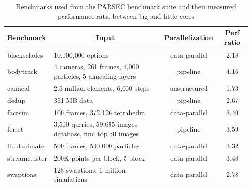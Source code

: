 \begin{table}[!t]
	\centering
	\scriptsize
	\caption{Benchmarks used from the PARSEC benchmark suite and their 
measured performance ratio between big and little cores}
	\setlength{\tabcolsep}{3pt}
	\begin{tabular}{|p{2cm}|p{2.5cm}|c|c|}
	\hline
	\textbf{Benchmark} & \multicolumn{1}{|c|}{\textbf{Input}} & \textbf{Parallelization} & \multicolumn{1}{|c|}{\textbf{Perf ratio}} \\
	\hline \hline
	blackscholes & 10,000,000 options & data-parallel &2.18 \\ \hline
	bodytrack & 4 cameras, 261 frames, 4,000 particles, 5 annealing layers & pipeline & 4.16 \\ \hline
	canneal & 2.5 million elements, 6,000 steps & unstructured & 1.73 \\ \hline
	dedup & 351 MB data & pipeline & 2.67 \\ \hline
	facesim & 100 frames, 372,126 tetrahedra & data-parallel & 3.40 \\ \hline
	ferret & 3,500 queries, 59,695 images database, find top 50 images & pipeline & 3.59 \\ \hline
	fluidanimate & 500 frames, 500,000 particles & data-parallel & 3.32 \\ \hline
	streamcluster & 200K points per block, 5 block & data-parallel & 3.48 \\ \hline
	swaptions & 128 swaptions, 1 million  simulations & data-parallel & 2.78 \\ \hline
	\end{tabular}
	\label{tab.AMC.apps}
\end{table}


% 



